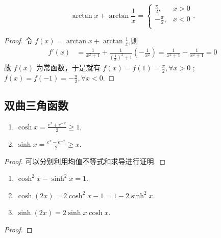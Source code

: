 \documentclass[../../main.tex]{subfiles}
\begin{document}
\begin{proposition}\label{proposition:arctan相关等式}
$$\arctan x+\arctan \frac{1}{x}=\begin{cases}
\frac{\pi}{2},&x>0\\
-\frac{\pi}{2},&x<0\\
\end{cases}.$$
\end{proposition}
\begin{proof}
令 \( f(x)=\arctan x+\arctan\frac{1}{x} \),则
\begin{align*}
f'(x)&=\frac{1}{x^2 + 1}+\frac{1}{(\frac{1}{x})^2 + 1}(-\frac{1}{x^2})=\frac{1}{x^2 + 1}-\frac{1}{x^2 + 1}=0
\end{align*}
故 \( f(x) \) 为常函数，于是就有 \( f(x)=f(1)=\frac{\pi}{2},\forall x>0 \) ;\( f(x)=f(-1)=-\frac{\pi}{2},\forall x<0 \).

\end{proof}


\subsection{双曲三角函数}

\begin{proposition}
\begin{enumerate}[(1)]
\item $\cosh x=\frac{e^{x}+e^{-x}}{2}\geqslant1,$

\item $\sinh x=\frac{e^{x}-e^{-x}}{2}\geqslant x.$
\end{enumerate}
\end{proposition}
\begin{proof}
可以分别利用均值不等式和求导进行证明. 

\end{proof}

\begin{proposition}
\begin{enumerate}
\item $\cosh^2 x-\sinh^2 x=1$.

\item $\cosh(2x)=2\cosh^2 x-1=1-2\sinh^2 x$.

\item $\sinh(2x)=2\sinh x\cosh x$. 
\end{enumerate}
\end{proposition}
\begin{proof}


\end{proof}
\end{document}
